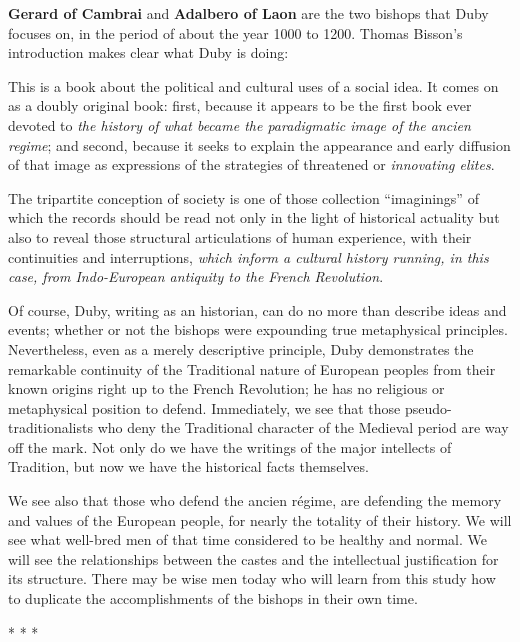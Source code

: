 \textbf{Gerard of Cambrai} and \textbf{Adalbero of Laon} are the two bishops that Duby focuses on, in the period of about the year 1000 to 1200. Thomas Bisson's introduction makes clear what Duby is doing:

\begin{quotationx}
This is a book about the political and cultural uses of a social idea. It comes on as a doubly original book: first, because it appears to be the first book ever devoted to \emph{the history of what became the paradigmatic image of the ancien regime}; and second, because it seeks to explain the appearance and early diffusion of that image as expressions of the strategies of threatened or \emph{innovating elites}.

The tripartite conception of society is one of those collection ``imaginings'' of which the records should be read not only in the light of historical actuality but also to reveal those structural articulations of human experience, with their continuities and interruptions, \emph{which inform a cultural history running, in this case, from Indo-European antiquity to the French Revolution}.
\end{quotationx}


Of course, Duby, writing as an historian, can do no more than describe ideas and events; whether or not the bishops were expounding true metaphysical principles. Nevertheless, even as a merely descriptive principle, Duby demonstrates the remarkable continuity of the Traditional nature of European peoples from their known origins right up to the French Revolution; he has no religious or metaphysical position to defend. Immediately, we see that those pseudo-traditionalists who deny the Traditional character of the Medieval period are way off the mark. Not only do we have the writings of the major intellects of Tradition, but now we have the historical facts themselves.

We see also that those who defend the ancien régime, are defending the memory and values of the European people, for nearly the totality of their history. We will see what well-bred men of that time considered to be healthy and normal. We will see the relationships between the castes and the intellectual justification for its structure. There may be wise men today who will learn from this study how to duplicate the accomplishments of the bishops in their own time.



\begin{center}* * *\end{center}

